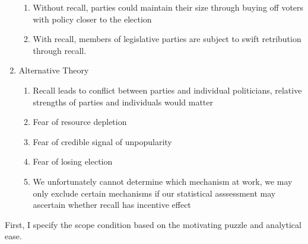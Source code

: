 \documentclass[hyphens, crop=false]{standalone}
\begin{document}
\begin{enumerate}
\begin{enumerate}
			\item 
			Without recall, parties could maintain their size through buying off voters with policy closer to the election
			\item 
			With recall, members of legislative parties are subject to swift retribution through recall.
		\end{enumerate}
		\item 
		Alternative Theory
		\begin{enumerate}
			\item 
			Recall leads to conflict between parties and individual politicians, relative strengths of parties and individuals would matter
			\item 
			Fear of resource depletion
			\item 
			Fear of credible signal of unpopularity
			\item 
			Fear of losing election
			\item 
			We unfortunately cannot determine which mechanism at work, we may only exclude certain mechanisms if our statistical asssessment may ascertain whether recall has incentive effect
		\end{enumerate}
	\end{enumerate}
	
	First, I specify the scope condition based on the motivating puzzle and analytical ease.
	
\end{document}
